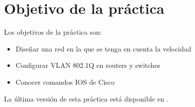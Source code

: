 
\usepackage{eurosym}


\renewcommand{\hmwkClass}{Planificación y Administración de Redes}
\renewcommand{\hmwkTitle}{Práctica VLAN en Cisco}









\primerapagina

\setlength{\parindent}{0em}
\setlength{\parskip}{1em}


\section{Objetivo de la práctica}
Los objetivos de la práctica son:
\begin{itemize}
\item Diseñar una red en la que se tenga en cuenta la velocidad
\item Configurar VLAN 802.1Q en routers y switches
\item Conocer comandos IOS de Cisco
\end{itemize}


La última versión de esta práctica está disponible en .


